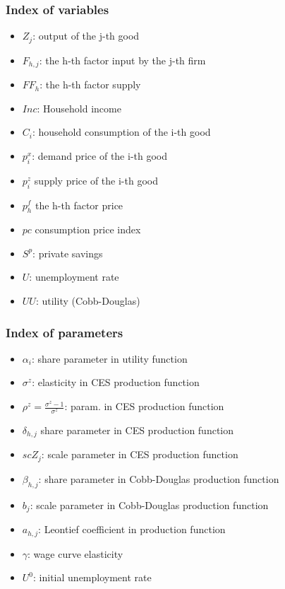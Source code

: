\subsubsection{Index of variables}
\begin{itemize}
	
	\item $Z_j$: output of the j-th good
	\item $F_{h,j}$: the h-th factor input by the j-th firm
	\item $FF_h$: the h-th factor supply
	\item $Inc$: Household income
	\item $C_i$: household consumption of the i-th good
	\item $p^x_i$: demand price of the i-th good
	\item $p^z_i$ supply price of the i-th good
	\item $p^f_h$ the h-th factor price
	\item $pc$ consumption price index
	\item $S^p$: private savings	
	\item $U$: unemployment rate
	\item $UU$: utility (Cobb-Douglas)
\end{itemize}

\subsubsection{Index of parameters}
\begin{itemize}
	\item $\alpha_i$: share parameter in utility function
	\item $\sigma^z$: elasticity in CES production function
	\item $\rho^z = \frac{\sigma^z - 1}{\sigma^z}$: param. in CES production function
	\item $\delta_{h,j}$ share parameter in CES production function
	\item $scZ_j$: scale parameter in CES production function  
	\item $\beta_{h,j}$: share parameter in Cobb-Douglas production function
	\item $b_j$: scale parameter in Cobb-Douglas production function
	\item $a_{h,j}$: Leontief coefficient in production function
	\item $\gamma$: wage curve elasticity
	\item $U^0$: initial unemployment rate
\end{itemize}



